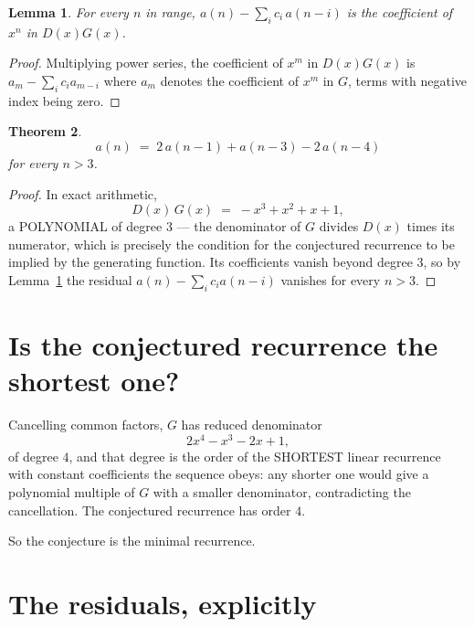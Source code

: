 \documentclass[11pt,a4paper]{article}
\theoremstyle{plain}
\newtheorem{theorem}{Theorem}
\newtheorem{lemma}[theorem]{Lemma}
\theoremstyle{definition}
\begin{document}
\begin{lemma}\label{lem:key}
For every $n$ in range, $a(n)-\sum_i c_i\,a(n-i)$ is the coefficient of $x^{n}$ in
$D(x)G(x)$.
\end{lemma}

\begin{proof}
Multiplying power series, the coefficient of $x^{m}$ in $D(x)G(x)$ is
$a_m-\sum_i c_i a_{m-i}$ where $a_m$ denotes the coefficient of $x^{m}$ in $G$, terms with
negative index being zero.
\end{proof}

\begin{theorem}
\[
a(n)\;=\;2\,a(n-1) + a(n-3) - 2\,a(n-4)
\]
for every $n>3$.
\end{theorem}

\begin{proof}
In exact arithmetic,
\[
D(x)\,G(x)\;=\;- x^{3} + x^{2} + x + 1,
\]
a POLYNOMIAL of degree $3$ --- the denominator of $G$ divides $D(x)$ times its numerator,
which is precisely the condition for the conjectured recurrence to be implied by the
generating function. Its coefficients vanish beyond degree $3$, so by
Lemma~\ref{lem:key} the residual $a(n)-\sum_ic_ia(n-i)$ vanishes for every
$n>3$.
\end{proof}

\section{Is the conjectured recurrence the shortest one?}

Cancelling common factors, $G$ has reduced denominator
\[
2 x^{4} - x^{3} - 2 x + 1,
\]
of degree $4$, and that degree is the order of the SHORTEST linear recurrence with
constant coefficients the sequence obeys: any shorter one would give a polynomial multiple of
$G$ with a smaller denominator, contradicting the cancellation. The conjectured recurrence has
order $4$.

So the conjecture is the minimal recurrence.

\section{The residuals, explicitly}
\end{document}
